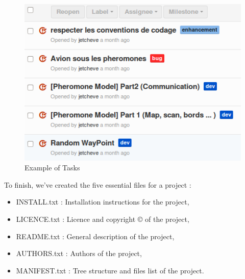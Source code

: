 \begin{figure}[!h]
\caption{\label{Tasks}Example of Tasks}
   \includegraphics[scale=0.7]{../images/tasks.png}
\end{figure}


To finish, we've created the five essential files for a project :

\begin{itemize}
\item INSTALL.txt  : Installation instructions for the project,
\item LICENCE.txt  : Licence and copyright \copyright{} of the project,
\item README.txt   : General description of the project,
\item AUTHORS.txt  : Authors of the project,
\item MANIFEST.txt : Tree structure and files list of the project.
\end{itemize}
